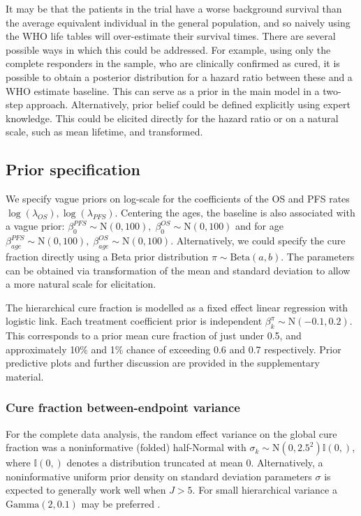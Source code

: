 \documentclass[AMA,STIX1COL]{WileyNJD-v2}
\begin{document}
It may be that the patients in the trial have a worse background survival than the average equivalent individual in the general population, and so naively using the WHO life tables will over-estimate their survival times.
There are several possible ways in which this could be addressed.
For example, using only the complete responders in the sample, who are clinically confirmed as cured, it is possible to obtain a posterior distribution for a hazard ratio between these and a WHO estimate baseline.
This can serve as a prior in the main model in a two-step approach. Alternatively, prior belief could be defined explicitly using expert knowledge.
This could be elicited directly for the hazard ratio or on a natural scale, such as mean lifetime, and transformed.

%
\subsection{Prior specification}
We specify vague priors on log-scale for the coefficients of the OS and PFS rates $\log(\lambda_{OS}),  \log(\lambda_{PFS})$.
Centering the ages, the baseline is also associated with a vague prior: ${\beta_0^{PFS} \sim \text{N}(0, 100),}\; {\beta_0^{OS} \sim \text{N}(0, 100)}$
and for age $\beta_{age}^{PFS} \sim \text{N}(0, 100),\; \beta_{age}^{OS} \sim \text{N}(0, 100)$.
Alternatively, we could specify the cure fraction directly using a Beta prior distribution $\pi \sim \text{Beta}(a, b)$.
The parameters can be obtained via transformation of the mean and standard deviation to allow a more natural scale for elicitation.

The hierarchical cure fraction is modelled as a fixed effect linear regression with logistic link. Each treatment coefficient prior is independent $\beta^{\pi}_k \sim \text{N}(-0.1, 0.2)$.
This corresponds to a prior mean cure fraction of just under 0.5, and approximately 10\% and 1\% chance of exceeding 0.6 and 0.7 respectively.
Prior predictive plots and further discussion are provided in the supplementary material.

\subsubsection{Cure fraction between-endpoint variance}
For the complete data analysis, the random effect variance on the global cure fraction was a noninformative (folded) half-Normal \cite{Gelman2006} with 
${\sigma_k \sim \text{N}(0, 2.5^2)\mathbb{I}(0,)}$, where $\mathbb{I}(0,)$ denotes a distribution truncated at mean 0.
Alternatively, a noninformative uniform prior density on standard deviation parameters $\sigma$ is expected to generally work well when $J > 5$.
For small hierarchical variance a $\text{Gamma}(2, 0.1)$ may be preferred \cite{Chung2013}.
\end{document}
